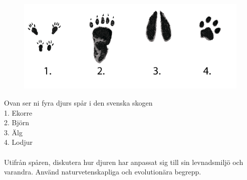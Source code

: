 \documentclass{exam}
\begin{document}
\begin{questions}
\begin{figure}[h]
    \centering
    \includegraphics[width=0.7\linewidth]{Screenshot 2024-03-25 12.02.23.png}
\end{figure}
\question
Ovan ser ni fyra djurs spår i den svenska skogen\\
1. Ekorre\\
2. Björn \\
3. Älg \\
4. Lodjur \\
\\
Utifrån spåren, diskutera hur djuren har anpassat sig till sin levnadsmiljö och varandra. Använd naturvetenskapliga och evolutionära begrepp. 
\end{questions}
\end{document}
